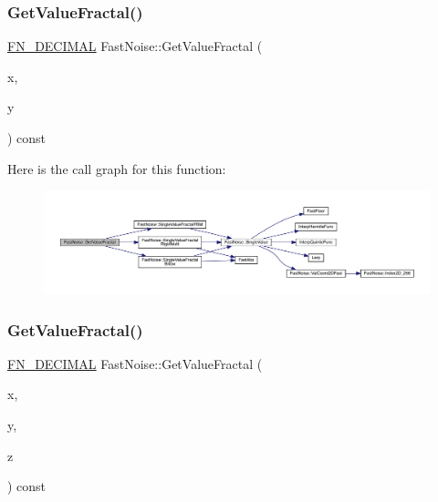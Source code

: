 \subsubsection{\texorpdfstring{Get\+Value\+Fractal()}{GetValueFractal()}\hspace{0.1cm}{\footnotesize\ttfamily [1/2]}}
{\footnotesize\ttfamily \mbox{\hyperlink{_fast_noise_8h_a75a9ef6d2541c4921815b885bfd449c3}{F\+N\+\_\+\+D\+E\+C\+I\+M\+AL}} Fast\+Noise\+::\+Get\+Value\+Fractal (\begin{DoxyParamCaption}\item[{\mbox{\hyperlink{_fast_noise_8h_a75a9ef6d2541c4921815b885bfd449c3}{F\+N\+\_\+\+D\+E\+C\+I\+M\+AL}}}]{x,  }\item[{\mbox{\hyperlink{_fast_noise_8h_a75a9ef6d2541c4921815b885bfd449c3}{F\+N\+\_\+\+D\+E\+C\+I\+M\+AL}}}]{y }\end{DoxyParamCaption}) const}

Here is the call graph for this function\+:
\nopagebreak
\begin{figure}[H]
\begin{center}
\leavevmode
\includegraphics[width=350pt]{class_fast_noise_a637789887aa7727d701d9dbcb261a170_cgraph}
\end{center}
\end{figure}
\mbox{\label{class_fast_noise_a972ef8f462048015489604783155fd17}} 
\subsubsection{\texorpdfstring{Get\+Value\+Fractal()}{GetValueFractal()}\hspace{0.1cm}{\footnotesize\ttfamily [2/2]}}
{\footnotesize\ttfamily \mbox{\hyperlink{_fast_noise_8h_a75a9ef6d2541c4921815b885bfd449c3}{F\+N\+\_\+\+D\+E\+C\+I\+M\+AL}} Fast\+Noise\+::\+Get\+Value\+Fractal (\begin{DoxyParamCaption}\item[{\mbox{\hyperlink{_fast_noise_8h_a75a9ef6d2541c4921815b885bfd449c3}{F\+N\+\_\+\+D\+E\+C\+I\+M\+AL}}}]{x,  }\item[{\mbox{\hyperlink{_fast_noise_8h_a75a9ef6d2541c4921815b885bfd449c3}{F\+N\+\_\+\+D\+E\+C\+I\+M\+AL}}}]{y,  }\item[{\mbox{\hyperlink{_fast_noise_8h_a75a9ef6d2541c4921815b885bfd449c3}{F\+N\+\_\+\+D\+E\+C\+I\+M\+AL}}}]{z }\end{DoxyParamCaption}) const}

